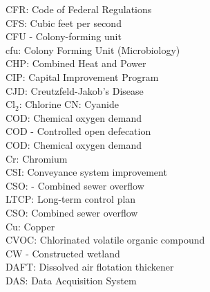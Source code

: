 \documentclass{article}
\begin{document}
CFR:  Code of Federal Regulations
\vspace{0.3cm}\\
CFS:  Cubic feet per second
\vspace{0.3cm}\\
CFU - Colony-forming unit
\vspace{0.3cm}\\
cfu:  Colony Forming Unit (Microbiology)
\vspace{0.3cm}\\
CHP:  Combined Heat and Power
\vspace{0.3cm}\\
CIP:  Capital Improvement Program
\vspace{0.3cm}\\
CJD:  Creutzfeld-Jakob's Disease
\vspace{0.3cm}\\
Cl$_2$:  Chlorine
CN:  Cyanide
\vspace{0.3cm}\\
COD: Chemical oxygen demand
\vspace{0.3cm}\\
COD - Controlled open defecation
\vspace{0.3cm}\\
COD:  Chemical oxygen demand 
\vspace{0.3cm}\\
Cr: Chromium
\vspace{0.3cm}\\
CSI:  Conveyance system improvement
\vspace{0.3cm}\\
CSO: - Combined sewer overflow 
\vspace{0.3cm}\\
LTCP:  Long-term control plan
\vspace{0.3cm}\\
CSO:  Combined sewer overflow
\vspace{0.3cm}\\
Cu: Copper
\vspace{0.3cm}\\
CVOC:  Chlorinated volatile organic compound
\vspace{0.3cm}\\
CW - Constructed wetland
\vspace{0.3cm}\\
DAFT:  Dissolved air flotation thickener
\vspace{0.3cm}\\
DAS:  Data Acquisition System
\vspace{0.3cm}\\
\end{document}
